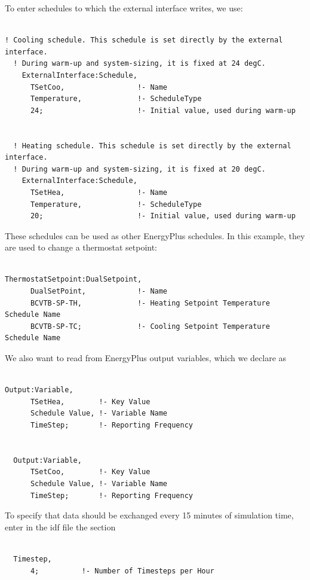 To enter schedules to which the external interface writes, we use:

\begin{lstlisting}

! Cooling schedule. This schedule is set directly by the external interface.
  ! During warm-up and system-sizing, it is fixed at 24 degC.
    ExternalInterface:Schedule,
      TSetCoo,                 !- Name
      Temperature,             !- ScheduleType
      24;                      !- Initial value, used during warm-up


  ! Heating schedule. This schedule is set directly by the external interface.
  ! During warm-up and system-sizing, it is fixed at 20 degC.
    ExternalInterface:Schedule,
      TSetHea,                 !- Name
      Temperature,             !- ScheduleType
      20;                      !- Initial value, used during warm-up
\end{lstlisting}

These schedules can be used as other EnergyPlus schedules. In this example, they are used to change a thermostat setpoint:

\begin{lstlisting}

ThermostatSetpoint:DualSetpoint,
      DualSetPoint,            !- Name
      BCVTB-SP-TH,             !- Heating Setpoint Temperature Schedule Name
      BCVTB-SP-TC;             !- Cooling Setpoint Temperature Schedule Name
\end{lstlisting}

We also want to read from EnergyPlus output variables, which we declare as

\begin{lstlisting}

Output:Variable,
      TSetHea,        !- Key Value
      Schedule Value, !- Variable Name
      TimeStep;       !- Reporting Frequency


  Output:Variable,
      TSetCoo,        !- Key Value
      Schedule Value, !- Variable Name
      TimeStep;       !- Reporting Frequency
\end{lstlisting}

To specify that data should be exchanged every 15 minutes of simulation time, enter in the idf file the section

\begin{lstlisting}

  Timestep,
      4;          !- Number of Timesteps per Hour
\end{lstlisting}

